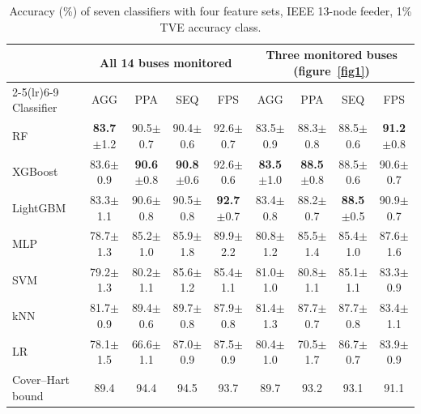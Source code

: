 \documentclass[11pt]{article}
\newenvironment{nwf}{}{}
\begin{document}
\begin{table}[!htbp]
\centering
\begin{nwf}
\caption{Accuracy (\%) of seven classifiers with four feature sets, IEEE 13-node feeder, 1\% TVE accuracy class.}\label{tab_fs}
\footnotesize
\setlength{\tabcolsep}{3.2pt}
\begin{tabular}{lcccccccc}
\toprule
 & \multicolumn{4}{c}{All 14 buses monitored} & \multicolumn{4}{c}{Three monitored buses (figure~\ref{fig1})} \\
\cmidrule(lr){2-5}\cmidrule(lr){6-9}
Classifier & AGG & PPA & SEQ & FPS & AGG & PPA & SEQ & FPS \\
\midrule
RF       & \textbf{83.7}$\pm$1.2 & 90.5$\pm$0.7 & 90.4$\pm$0.6 & 92.6$\pm$0.7 & 83.5$\pm$0.9 & 88.3$\pm$0.8 & 88.5$\pm$0.6 & \textbf{91.2}$\pm$0.8 \\
XGBoost  & 83.6$\pm$0.9 & \textbf{90.6}$\pm$0.8 & \textbf{90.8}$\pm$0.6 & 92.6$\pm$0.6 & \textbf{83.5}$\pm$1.0 & \textbf{88.5}$\pm$0.8 & 88.5$\pm$0.6 & 90.6$\pm$0.7 \\
LightGBM & 83.3$\pm$1.1 & 90.6$\pm$0.8 & 90.5$\pm$0.8 & \textbf{92.7}$\pm$0.7 & 83.4$\pm$0.8 & 88.2$\pm$0.7 & \textbf{88.5}$\pm$0.5 & 90.9$\pm$0.7 \\
MLP      & 78.7$\pm$1.3 & 85.2$\pm$1.0 & 85.9$\pm$1.8 & 89.9$\pm$2.2 & 80.8$\pm$1.2 & 85.5$\pm$1.4 & 85.4$\pm$1.0 & 87.6$\pm$1.6 \\
SVM      & 79.2$\pm$1.3 & 80.2$\pm$1.1 & 85.6$\pm$1.2 & 85.4$\pm$1.1 & 81.0$\pm$1.0 & 80.8$\pm$1.1 & 85.1$\pm$1.1 & 83.3$\pm$0.9 \\
kNN      & 81.7$\pm$0.9 & 89.4$\pm$0.6 & 89.7$\pm$0.8 & 87.9$\pm$0.8 & 81.4$\pm$1.3 & 87.7$\pm$0.7 & 87.7$\pm$0.8 & 83.4$\pm$1.1 \\
LR       & 78.1$\pm$1.5 & 66.6$\pm$1.1 & 87.0$\pm$0.9 & 87.5$\pm$0.9 & 80.4$\pm$1.0 & 70.5$\pm$1.7 & 86.7$\pm$0.7 & 83.9$\pm$0.9 \\
\midrule
Cover--Hart bound & 89.4 & 94.4 & 94.5 & 93.7 & 89.7 & 93.2 & 93.1 & 91.1 \\
\bottomrule
\end{tabular}
\end{nwf}
\end{table}
\end{document}
